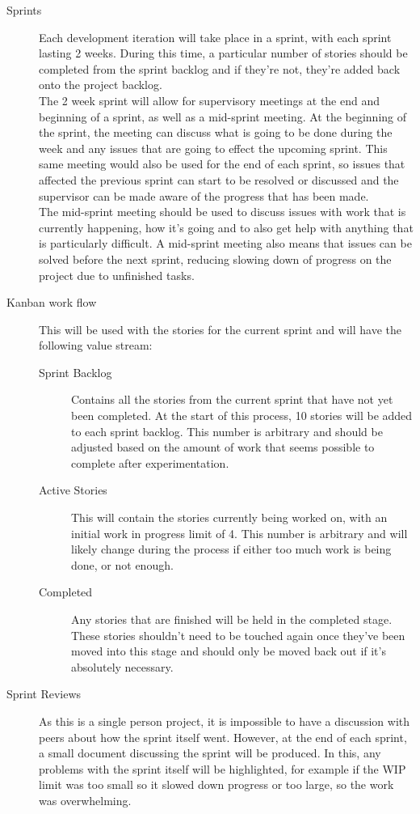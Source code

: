 \begin{description}
	\item[Sprints]
	Each development iteration will take place in a sprint, with each sprint lasting 2 weeks. During this time, a particular number of stories should be completed from the sprint backlog and if they're not, they're added back onto the project backlog.\\
	
	The 2 week sprint will allow for supervisory meetings at the end and beginning of a sprint, as well as a mid-sprint meeting. At the beginning of the sprint, the meeting can discuss what is going to be done during the week and any issues that are going to effect the upcoming sprint. This same meeting would also be used for the end of each sprint, so issues that affected the previous sprint can start to be resolved or discussed and the supervisor can be made aware of the progress that has been made.\\
	
	The mid-sprint meeting should be used to discuss issues with work that is currently happening, how it's going and to also get help with anything that is particularly difficult. A mid-sprint meeting also means that issues can be solved before the next sprint, reducing slowing down of progress on the project due to unfinished tasks.\\
	
	\item[Kanban work flow]
	This will be used with the stories for the current sprint and will have the following value stream:
	\begin{description}
		\item[Sprint Backlog]
		Contains all the stories from the current sprint that have not yet been completed. At the start of this process, 10 stories will be added to each sprint backlog. This number is arbitrary and should be adjusted based on the amount of work that seems possible to complete after experimentation.
		\item[Active Stories]
		This will contain the stories currently being worked on, with an initial work in progress limit of 4. This number is arbitrary and will likely change during the process if either too much work is being done, or not enough.
		\item[Completed]
		Any stories that are finished will be held in the completed stage. These stories shouldn't need to be touched again once they've been moved into this stage and should only be moved back out if it's absolutely necessary.
	\end{description}
	\item[Sprint Reviews]
	As this is a single person project, it is impossible to have a discussion with peers about how the sprint itself went. However, at the end of each sprint, a small document discussing the sprint will be produced. In this, any problems with the sprint itself will be highlighted, for example if the WIP limit was too small so it slowed down progress or too large, so the work was overwhelming. 
	

\end{description}
